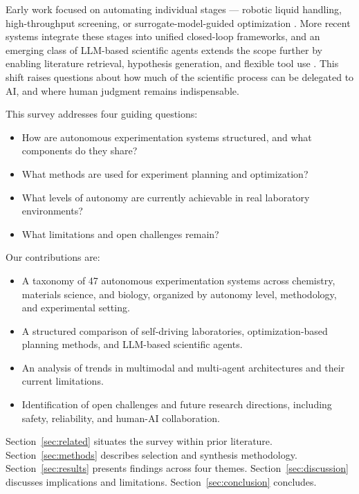 \documentclass{article}
\begin{document}
Early work focused on automating individual stages — robotic liquid handling, high-throughput screening, or surrogate-model-guided optimization \cite{burger2020mobile, macleod2020self}. More recent systems integrate these stages into unified closed-loop frameworks, and an emerging class of LLM-based scientific agents extends the scope further by enabling literature retrieval, hypothesis generation, and flexible tool use \cite{bran2023chemcrow, boiko2023autonomous}. This shift raises questions about how much of the scientific process can be delegated to AI, and where human judgment remains indispensable.

This survey addresses four guiding questions:
\begin{itemize}
  \item How are autonomous experimentation systems structured, and what components do they share?
  \item What methods are used for experiment planning and optimization?
  \item What levels of autonomy are currently achievable in real laboratory environments?
  \item What limitations and open challenges remain?
\end{itemize}

Our contributions are:
\begin{itemize}
  \item A taxonomy of 47 autonomous experimentation systems across chemistry, materials science, and biology, organized by autonomy level, methodology, and experimental setting.
  \item A structured comparison of self-driving laboratories, optimization-based planning methods, and LLM-based scientific agents.
  \item An analysis of trends in multimodal and multi-agent architectures and their current limitations.
  \item Identification of open challenges and future research directions, including safety, reliability, and human-AI collaboration.
\end{itemize}

Section~\ref{sec:related} situates the survey within prior literature. Section~\ref{sec:methods} describes selection and synthesis methodology. Section~\ref{sec:results} presents findings across four themes. Section~\ref{sec:discussion} discusses implications and limitations. Section~\ref{sec:conclusion} concludes.

\end{document}
